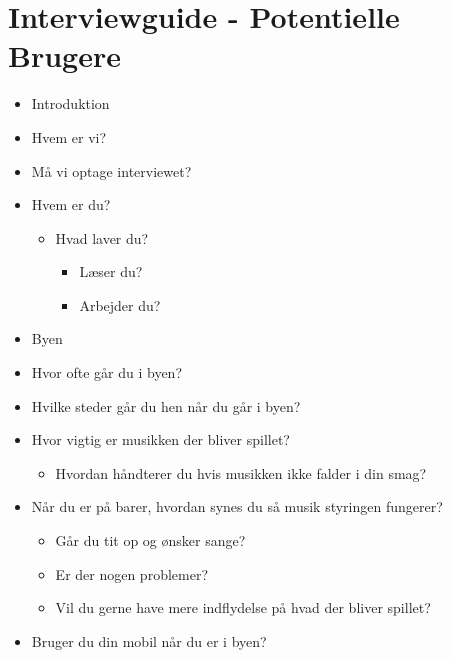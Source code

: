\chapter{Interviewguide - Potentielle Brugere}
\label{app:interviewguidePotentielleBrugere_guide}

\begin{itemize}
\itemsep1pt\parskip0pt
\item
  Introduktion
\item
  Hvem er vi?
\item
  Må vi optage interviewet?
\item
  Hvem er du?

  \begin{itemize}
  \itemsep1pt\parskip0pt
  \item
    Hvad laver du?

    \begin{itemize}
    \itemsep1pt\parskip0pt
    \item
      Læser du?
    \item
      Arbejder du?
    \end{itemize}
  \end{itemize}
\item
  Byen
\item
  Hvor ofte går du i byen?
\item
  Hvilke steder går du hen når du går i byen?
\item
  Hvor vigtig er musikken der bliver spillet?

  \begin{itemize}
  \itemsep1pt\parskip0pt
  \item
    Hvordan håndterer du hvis musikken ikke falder i din smag?
  \end{itemize}
\item
  Når du er på barer, hvordan synes du så musik styringen fungerer?

  \begin{itemize}
  \itemsep1pt\parskip0pt
  \item
    Går du tit op og ønsker sange?
  \item
    Er der nogen problemer?
  \item
    Vil du gerne have mere indflydelse på hvad der bliver spillet?
  \end{itemize}
\item
  Bruger du din mobil når du er i byen?


\end{itemize}
